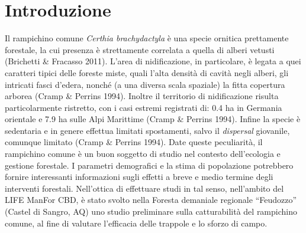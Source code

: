 \section*{Introduzione}
Il rampichino comune \textit{Certhia brachydactyla} \`e una specie
ornitica prettamente forestale, la cui presenza \`e strettamente
correlata a quella di alberi vetusti (Brichetti \& Fracasso 2011).
L{\textquoteright}area di nidificazione, in particolare, \`e legata a
quei caratteri tipici delle foreste miste, quali l{\textquoteright}alta
densit\`a di cavit\`a negli alberi, gli intricati fasci
d{\textquoteright}edera, nonch\'e (a una diversa scala spaziale) la
fitta copertura arborea (Cramp \& Perrins 1994). Inoltre il territorio
di nidificazione risulta particolarmente ristretto, con i casi estremi
registrati di: 0.4 ha in Germania orientale e 7.9 ha sulle Alpi
Marittime (Cramp \& Perrins 1994). Infine la specie \`e sedentaria e in
genere effettua limitati spostamenti, salvo il \textit{dispersal
}giovanile, comunque limitato (Cramp \& Perrins 1994). Date queste
peculiarit\`a, il rampichino comune \`e un buon soggetto di studio nel
contesto dell{\textquoteright}ecologia e gestione forestale. I
parametri demografici e la stima di popolazione potrebbero fornire
interessanti informazioni sugli effetti a breve e medio termine degli
interventi forestali. Nell{\textquoteright}ottica di effettuare studi
in tal senso, nell{\textquoteright}ambito del LIFE ManFor CBD, \`e
stato svolto nella Foresta demaniale regionale
{\textquotedblleft}Feudozzo{\textquotedblright} (Castel di Sangro, AQ)
uno studio preliminare sulla catturabilit\`a del rampichino comune, al
fine di valutare l{\textquoteright}efficacia delle trappole e lo sforzo
di campo.

